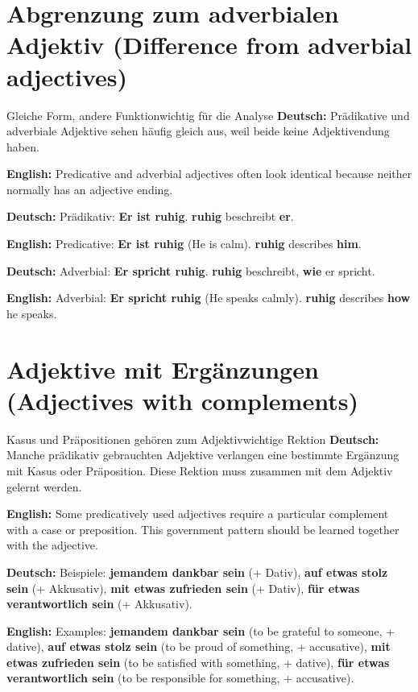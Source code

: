 \documentclass[a4paper,11pt]{article}
\newcommand{\GermanText}[1]{\textbf{Deutsch: }#1\par}
\newcommand{\EnglishText}[1]{{\small\color{SoftGray}\textbf{English: }#1\par}}
\begin{document}
    \section{Abgrenzung zum adverbialen Adjektiv \textnormal{(Difference from adverbial adjectives)}}

        \begin{grammarentry}{Gleiche Form, andere Funktion}{wichtig für die Analyse}
            \GermanText{Prädikative und adverbiale Adjektive sehen häufig gleich aus, weil beide keine Adjektivendung haben.}
            \EnglishText{Predicative and adverbial adjectives often look identical because neither normally has an adjective ending.}

            \GermanText{Prädikativ: \textbf{Er ist ruhig}. \textbf{ruhig} beschreibt \textbf{er}.}
            \EnglishText{Predicative: \textbf{Er ist ruhig} (He is calm). \textbf{ruhig} describes \textbf{him}.}

            \GermanText{Adverbial: \textbf{Er spricht ruhig}. \textbf{ruhig} beschreibt, \textbf{wie} er spricht.}
            \EnglishText{Adverbial: \textbf{Er spricht ruhig} (He speaks calmly). \textbf{ruhig} describes \textbf{how} he speaks.}
        \end{grammarentry}

    \section{Adjektive mit Ergänzungen \textnormal{(Adjectives with complements)}}

        \begin{grammarentry}{Kasus und Präpositionen gehören zum Adjektiv}{wichtige Rektion}
            \GermanText{Manche prädikativ gebrauchten Adjektive verlangen eine bestimmte Ergänzung mit Kasus oder Präposition. Diese Rektion muss zusammen mit dem Adjektiv gelernt werden.}
            \EnglishText{Some predicatively used adjectives require a particular complement with a case or preposition. This government pattern should be learned together with the adjective.}

            \GermanText{Beispiele: \textbf{jemandem dankbar sein} (+ Dativ), \textbf{auf etwas stolz sein} (+ Akkusativ), \textbf{mit etwas zufrieden sein} (+ Dativ), \textbf{für etwas verantwortlich sein} (+ Akkusativ).}
            \EnglishText{Examples: \textbf{jemandem dankbar sein} (to be grateful to someone, + dative), \textbf{auf etwas stolz sein} (to be proud of something, + accusative), \textbf{mit etwas zufrieden sein} (to be satisfied with something, + dative), \textbf{für etwas verantwortlich sein} (to be responsible for something, + accusative).}
        \end{grammarentry}
\end{document}

